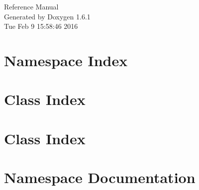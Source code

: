 \documentclass[a4paper]{book}
\begin{document}
\hypersetup{pageanchor=false}
\begin{titlepage}
\vspace*{7cm}
\begin{center}
{\Large Reference Manual}\\
\vspace*{1cm}
{\large Generated by Doxygen 1.6.1}\\
\vspace*{0.5cm}
{\small Tue Feb 9 15:58:46 2016}\\
\end{center}
\end{titlepage}
\clearemptydoublepage
{}
\tableofcontents
\clearemptydoublepage
{}
\hypersetup{pageanchor=true}
\chapter{Namespace Index}

\chapter{Class Index}

\chapter{Class Index}

\chapter{Namespace Documentation}




\end{document}

